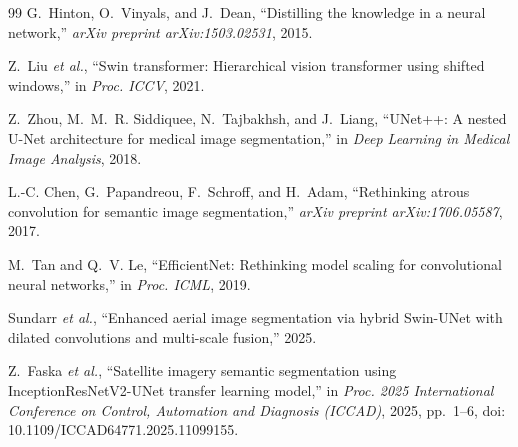 \documentclass[journal]{IEEEtran}
\begin{document}
\begin{thebibliography}{99}
G.~Hinton, O.~Vinyals, and J.~Dean, ``Distilling the knowledge in a neural network,'' \emph{arXiv preprint arXiv:1503.02531}, 2015.

Z.~Liu \emph{et al.}, ``Swin transformer: Hierarchical vision transformer using shifted windows,'' in \emph{Proc. ICCV}, 2021.

Z.~Zhou, M.~M.~R. Siddiquee, N.~Tajbakhsh, and J.~Liang, ``UNet++: A nested U-Net architecture for medical image segmentation,'' in \emph{Deep Learning in Medical Image Analysis}, 2018.

L.-C. Chen, G.~Papandreou, F.~Schroff, and H.~Adam, ``Rethinking atrous convolution for semantic image segmentation,'' \emph{arXiv preprint arXiv:1706.05587}, 2017.

M.~Tan and Q.~V. Le, ``EfficientNet: Rethinking model scaling for convolutional neural networks,'' in \emph{Proc. ICML}, 2019.

Sundarr \emph{et al.}, ``Enhanced aerial image segmentation via hybrid Swin-UNet with dilated convolutions and multi-scale fusion,'' 2025.

Z.~Faska \emph{et al.}, ``Satellite imagery semantic segmentation using InceptionResNetV2-UNet transfer learning model,'' in \emph{Proc. 2025 International Conference on Control, Automation and Diagnosis (ICCAD)}, 2025, pp.~1--6, doi: 10.1109/ICCAD64771.2025.11099155.
\end{thebibliography}
\end{document}

